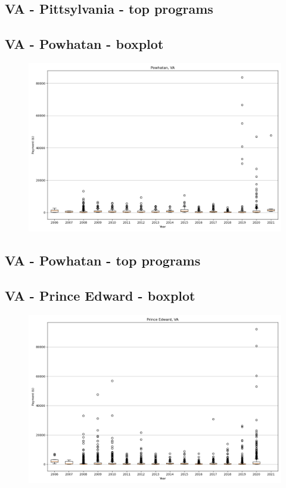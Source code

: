 \subsection*{VA - Pittsylvania - top programs}

\newpage
\subsection*{VA - Powhatan - boxplot}
\begin{figure}[h]
\centering
\includegraphics[width=7in]{../output/boxplots/counties/Powhatan-VA_boxplot.png}
\end{figure}


\subsection*{VA - Powhatan - top programs}

\newpage
\subsection*{VA - Prince Edward - boxplot}
\begin{figure}[h]
\centering
\includegraphics[width=7in]{../output/boxplots/counties/Prince Edward-VA_boxplot.png}
\end{figure}


